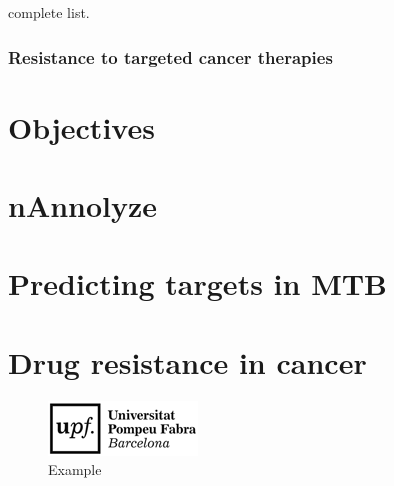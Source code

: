 \documentclass[12pt, a4paper,twoside]{tesi_upf}
\begin{document}
 
 
  


\par complete list. 


\subsection{Resistance to targeted cancer therapies}





\chapter{Objectives}

\chapter{nAnnolyze}
\chapter{Predicting targets in MTB}
\chapter{Drug resistance in cancer}



\begin{figure}[b]
  \centering
  \includegraphics[scale=0.5]{../figures/logo_upf.png}
    \caption{Example}
    \label{fig:logo}
\end{figure}





%



\backmatter
\printindex

\printbibliography
\end{document}
